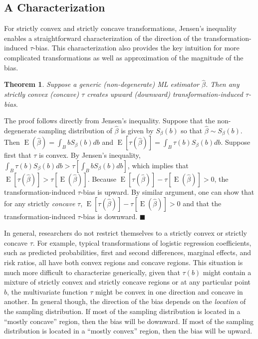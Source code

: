 \documentclass[12pt]{article}
\newtheorem{theorem}{Theorem}
\newenvironment{proof}[1][Proof]{\begin{trivlist}
\item[\hskip \labelsep {\bfseries #1}]}{\end{trivlist}}
\DeclareMathOperator*{\E}{\text{E}}
\begin{document}
\subsection*{A Characterization}

For strictly convex and strictly concave transformations, Jensen's inequality enables a straightforward characterization of the direction of the transformation-induced $\tau$-bias. 
This characterization also provides the key intuition for more complicated transformations as well as approximation of the magnitude of the bias.
\begin{theorem}
Suppose a generic (non-degenerate) ML estimator $\hat{\beta}$. Then any strictly convex (concave) $\tau$ creates upward (downward) transformation-induced $\tau$-bias.
\end{theorem} 
\begin{proof}
The proof follows directly from Jensen's inequality. 
Suppose that the non-degenerate sampling distribution of $\hat{\beta}$ is given by $S_\beta(b)$ so that $\hat{\beta} \sim S_\beta(b)$. 
Then $\E(\hat{\beta}) = \int_{B}bS_\beta(b)db$ and $\E[\tau(\hat{\beta})]  = \int_{B}\tau(b)S_\beta(b)db$. 
Suppose first that $\tau$ is convex. 
By Jensen's inequality, $\int_{B}\tau(b)S_\beta(b)db > \tau \left[ \int_{B}bS_\beta(b)db \right]$, which implies that $\E[\tau(\hat{\beta})] > \tau[\E(\hat{\beta})]$. 
Because $\E[\tau(\hat{\beta})] - \tau[\E(\hat{\beta})] > 0$, the transformation-induced $\tau$-bias is upward. 
By similar argument, one can show that for any strictly \textit{concave} $\tau$, $\E[\tau(\hat{\beta})] - \tau[\E(\hat{\beta})] > 0$ and that the transformation-induced $\tau$-bias is downward. $\blacksquare$
\end{proof}

In general, researchers do not restrict themselves to a strictly convex or strictly concave $\tau$. 
For example, typical transformations of logistic regression coefficients, such as predicted probabilities, first and second differences, marginal effects, and risk ratios, all have both convex regions and concave regions. 
This situation is much more difficult to characterize generically, given that $\tau(b)$ might contain a mixture of strictly convex and strictly concave regions or at any particular point $b$, the multivariate function $\tau$ might be convex in one direction and concave in another. In general though, the direction of the bias depends on the \textit{location} of the sampling distribution. If most of the sampling distribution is located in a ``mostly concave'' region, then the bias will be downward. If most of the sampling distribution is located in a ``mostly convex'' region, then the bias will be upward. 
\end{document}
